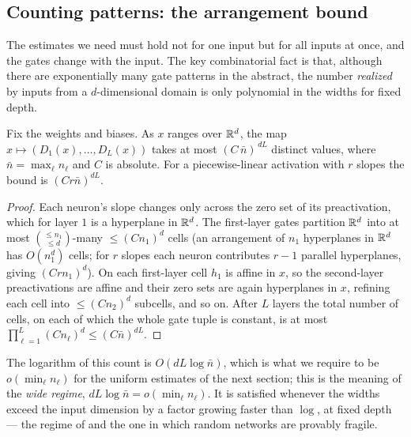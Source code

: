 \subsection{Counting patterns: the arrangement bound}
The estimates we need must hold not for one input but for all inputs at once, and the gates change
with the input. The key combinatorial fact is that, although there are exponentially many gate
patterns in the abstract, the number \emph{realized} by inputs from a $d$-dimensional domain is only
polynomial in the widths for fixed depth.

\begin{lemma}\label{lem:arrangement}
Fix the weights and biases. As $x$ ranges over $\mathbb{R}^d$, the map $x\mapsto(D_1(x),\dots,D_L(x))$ takes at
most $(C\,\bar n)^{\,d L}$ distinct values, where $\bar n=\max_\ell n_\ell$ and $C$ is absolute. For a
piecewise-linear activation with $r$ slopes the bound is $(C r\bar n)^{dL}$.
\end{lemma}

\begin{proof}
Each neuron's slope changes only across the zero set of its preactivation, which for layer $1$ is a
hyperplane in $\mathbb{R}^d$. The first-layer gates partition $\mathbb{R}^d$ into at most $\binom{\le n_1}{\le d}$-many
$\le(Cn_1)^d$ cells (an arrangement of $n_1$ hyperplanes in $\mathbb{R}^d$ has $O(n_1^d)$ cells; for $r$
slopes each neuron contributes $r-1$ parallel hyperplanes, giving $(Crn_1)^d$). On each first-layer
cell $h_1$ is affine in $x$, so the second-layer preactivations are affine and their zero sets are
again hyperplanes in $x$, refining each cell into $\le(Cn_2)^d$ subcells, and so on. After $L$ layers
the total number of cells, on each of which the whole gate tuple is constant, is at most
$\prod_{\ell=1}^L(Cn_\ell)^d\le(C\bar n)^{dL}$.
\end{proof}

The logarithm of this count is $O(dL\log\bar n)$, which is what we require to be $o(\min_\ell n_\ell)$
for the uniform estimates of the next section; this is the meaning of the \emph{wide regime},
$dL\log\bar n=o(\min_\ell n_\ell)$. It is satisfied whenever the widths exceed the input dimension by a
factor growing faster than $\log$, at fixed depth --- the regime of \cite{bartlettBC21} and the one in
which random networks are provably fragile.
